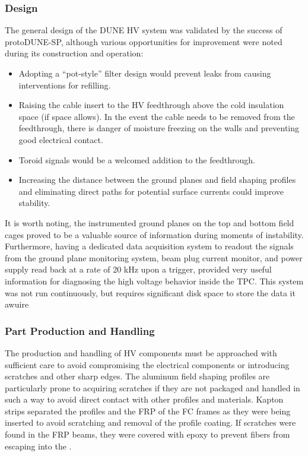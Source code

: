 \subsubsection{Design}
\label{sec:fdsp-hv-protodune-lessons-design}
The general design of the DUNE HV system was validated by the success of protoDUNE-SP, although various opportunities for improvement were noted during its construction and operation:

\begin{itemize}
\item Adopting a ``pot-style'' filter design would prevent leaks from causing interventions for refilling.
\item Raising the cable insert to the HV feedthrough above the cold insulation space (if space allows). In the event the cable needs to be removed from the feedthrough, there is danger of moisture freezing on the walls and preventing good electrical contact. \item Toroid signals would be a welcomed addition to the feedthrough.
\item Increasing the distance between the ground planes and field shaping profiles and eliminating direct paths for potential surface currents could improve stability.
\end{itemize}

It is worth noting, the instrumented ground planes on the top and bottom field cages proved to be a valuable source of information during moments of instability.
Furthermore, having a dedicated data acquisition system to readout the signals from the ground plane monitoring system, beam plug current monitor, and power supply read back at a rate of 20 kHz upon a trigger, provided very useful information for diagnosing the high voltage behavior inside the TPC.
This system was not run continuously, but requires significant disk space to store the data it awuire

\subsubsection{Part Production and Handling}
\label{sec:fdsp-hv-protodune-lessons-assy}
The production and handling of HV components must be approached with sufficient care to avoid compromising the electrical components or introducing scratches and other sharp edges.
The aluminum field shaping profiles are particularly prone to acquiring scratches if they are not packaged and handled in such a way to avoid direct contact with other profiles and materials.
Kapton strips separated the profiles and the FRP of the FC frames as they were being inserted to avoid scratching and removal of the profile coating.
If scratches were found in the FRP beams, they were covered with epoxy to prevent fibers from escaping into the .

